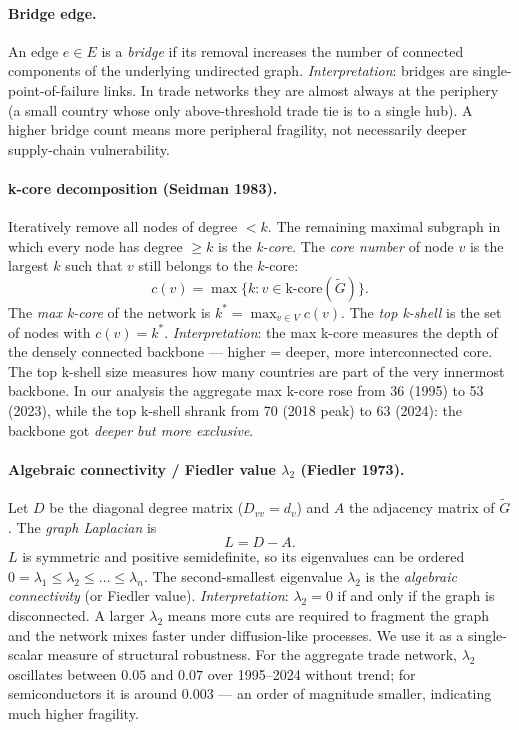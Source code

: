 \documentclass[11pt,a4paper]{article}
\begin{document}
\paragraph{Bridge edge.}
An edge $e \in E$ is a \emph{bridge} if its removal increases the number
of connected components of the underlying undirected graph.
\emph{Interpretation}: bridges are single-point-of-failure links.
In trade networks they are almost always at the periphery (a small
country whose only above-threshold trade tie is to a single hub).
A higher bridge count means more peripheral fragility, not necessarily
deeper supply-chain vulnerability.

\paragraph{k-core decomposition (Seidman 1983).}
Iteratively remove all nodes of degree $<k$. The remaining maximal
subgraph in which every node has degree $\geq k$ is the \emph{k-core}.
The \emph{core number} of node $v$ is the largest $k$ such that $v$ still
belongs to the $k$-core:
\[
c(v) = \max\{k : v \in \text{k-core}(\tilde{G})\}.
\]
The \emph{max k-core} of the network is $k^{*} = \max_{v \in V} c(v)$.
The \emph{top k-shell} is the set of nodes with $c(v) = k^{*}$.
\emph{Interpretation}: the max k-core measures the depth of the densely
connected backbone — higher = deeper, more interconnected core. The
top k-shell size measures how many countries are part of the very innermost
backbone. In our analysis the aggregate max k-core rose from 36 (1995) to
53 (2023), while the top k-shell shrank from 70 (2018 peak) to 63 (2024):
the backbone got \emph{deeper but more exclusive}.

\paragraph{Algebraic connectivity / Fiedler value $\lambda_2$ (Fiedler 1973).}
Let $D$ be the diagonal degree matrix ($D_{vv} = d_v$) and $A$ the
adjacency matrix of $\tilde{G}$. The \emph{graph Laplacian} is
\[
L = D - A.
\]
$L$ is symmetric and positive semidefinite, so its eigenvalues can be
ordered $0 = \lambda_1 \leq \lambda_2 \leq \dots \leq \lambda_n$.
The second-smallest eigenvalue $\lambda_2$ is the \emph{algebraic
connectivity} (or Fiedler value).
\emph{Interpretation}: $\lambda_2 = 0$ if and only if the graph is
disconnected. A larger $\lambda_2$ means more cuts are required to
fragment the graph and the network mixes faster under diffusion-like
processes. We use it as a single-scalar measure of structural robustness.
For the aggregate trade network, $\lambda_2$ oscillates between $0.05$
and $0.07$ over 1995--2024 without trend; for semiconductors it is around
$0.003$ — an order of magnitude smaller, indicating much higher
fragility.
\end{document}
